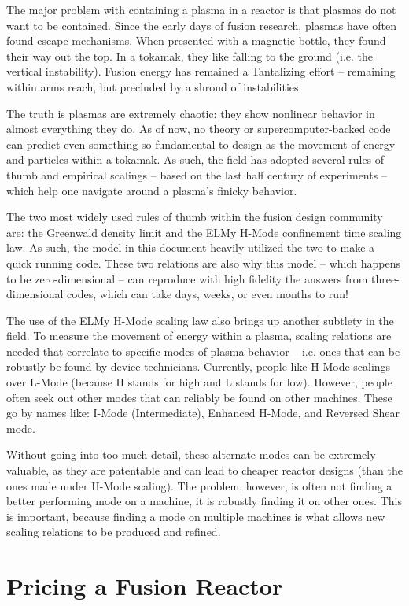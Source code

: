 The major problem with containing a plasma in a reactor is that plasmas do not want to be contained. Since the early days of fusion research, plasmas have often found escape mechanisms. When presented with a magnetic bottle, they found their way out the top. In a tokamak, they like falling to the ground (i.e. the vertical instability). Fusion energy has remained a Tantalizing effort -- remaining within arms reach, but precluded by a shroud of instabilities.

The truth is plasmas are extremely chaotic: they show nonlinear behavior in almost everything they do. As of now, no theory or supercomputer-backed code can predict even something so fundamental to design as the movement of energy and particles within a tokamak. As such, the field has adopted several rules of thumb and empirical scalings -- based on the last half century of experiments -- which help one navigate around a plasma's finicky behavior.

The two most widely used rules of thumb within the fusion design community are: the Greenwald density limit and the ELMy H-Mode confinement time scaling law. As such, the model in this document heavily utilized the two to make a quick running code. These two relations are also why this model -- which happens to be zero-dimensional -- can reproduce with high fidelity the answers from three-dimensional codes, which can take days, weeks, or even months to run!

The use of the ELMy H-Mode scaling law also brings up another subtlety in the field. To measure the movement of energy within a plasma, scaling relations are needed that correlate to specific modes of plasma behavior -- i.e. ones that can be robustly be found by device technicians. Currently, people like H-Mode scalings over L-Mode (because H stands for high and L stands for low). However, people often seek out other modes that can reliably be found on other machines. These go by names like: I-Mode (Intermediate), Enhanced H-Mode, and Reversed Shear mode. 

Without going into too much detail, these alternate modes can be extremely valuable, as they are patentable and can lead to cheaper reactor designs (than the ones made under H-Mode scaling). The problem, however, is often not finding a better performing mode on a machine, it is robustly finding it on other ones. This is important, because finding a mode on multiple machines is what allows new scaling relations to be produced and refined.

\section{Pricing a Fusion Reactor}

